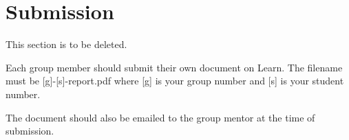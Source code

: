 \documentclass{article}
\begin{document}
\section*{Submission}
This section is to be deleted.

Each group member should submit their own document on Learn.
The filename must be [g]-[s]-report.pdf where [g] is your group number and  [s] is your student number.

The document should also be emailed to the group mentor at the time of submission.




\end{document}
